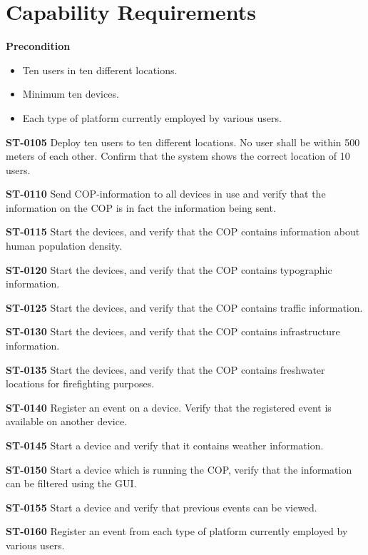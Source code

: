 \section{Capability Requirements}
\textbf{Precondition}
\begin{itemize}
\item Ten users in ten different locations.
\item Minimum ten devices. 
\item Each type of platform currently employed by various users. \\
\end{itemize}


\begin{description}

\item\textbf{ST-0105} Deploy ten users to ten different locations. No user shall be within 500 meters of each other. Confirm that the system shows the correct location of 10 users. 
\item\textbf{ST-0110} Send COP-information to all devices in use and verify that the information on the COP is in fact the information being sent. 
\item\textbf{ST-0115} Start the devices, and verify that the COP contains information about human population density. 
\item\textbf{ST-0120} Start the devices, and verify that the COP contains typographic information. 
\item\textbf{ST-0125} Start the devices, and verify that the COP contains traffic information. 
\item\textbf{ST-0130} Start the devices, and verify that the COP contains infrastructure information. 
\item\textbf{ST-0135} Start the devices, and verify that the COP contains freshwater locations for firefighting purposes. 
\item\textbf{ST-0140} Register an event on a device. Verify that the registered event is available on another device. 
\item\textbf{ST-0145} Start a device and verify that it contains weather information. 
\item\textbf{ST-0150} Start a device which is running the COP, verify that the information can be filtered using the GUI. 
\item\textbf{ST-0155} Start a device and verify that previous events can be viewed. 
\item\textbf{ST-0160} Register an event from each type of platform currently employed by various users. 

\end{description}

